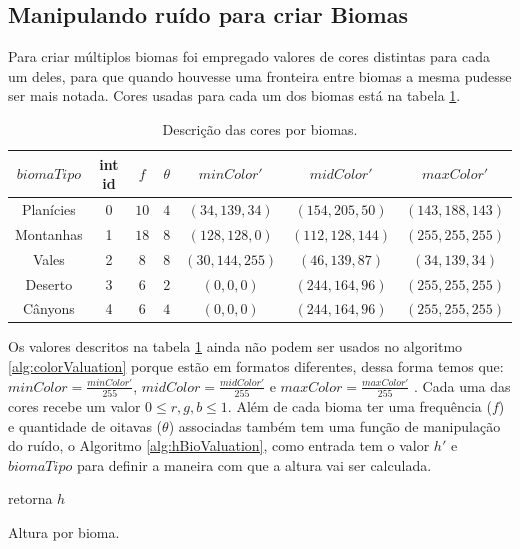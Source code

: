 \subsection{Manipulando ruído para criar Biomas}
Para criar múltiplos biomas foi empregado valores de cores distintas para cada um deles, 
para que quando houvesse uma fronteira entre biomas a mesma pudesse ser mais notada. 
Cores usadas para cada um dos biomas está na tabela \ref{tab:bioColors}.
\begin{table}[H]
    \centering
    \caption{Descrição das cores por biomas.}
    \label{tab:bioColors}
    \begin{tabular}{| c | c c c c c c|}
        \hline
        $biomaTipo$ & int id & $f$ & $\theta$ & $minColor'$ & $midColor'$ & $maxColor'$\\
        \hline
        Planícies   & 0 & $10$ & $4$ & $(34, 139, 34) $ & $(154, 205, 50) $ & $(143,188,143)  $  \\
        Montanhas & 1 & $18$ & $8$ & $(128, 128, 0) $ & $(112, 128, 144)$ & $(255, 255, 255)$  \\
        Vales   & 2 & $8$  & $8$ & $(30, 144, 255)$ & $(46, 139, 87)  $ & $(34, 139, 34)  $  \\
        Deserto   & 3 & $6$  & $2$ & $(0, 0, 0)     $ & $(244, 164, 96) $ & $(255, 255, 255)$  \\
        Cânyons  & 4 & $6$  & $4$ & $(0, 0, 0)     $ & $(244, 164, 96) $ & $(255, 255, 255)$  \\
        \hline
    \end{tabular}
\end{table}

Os valores descritos na tabela \ref{tab:bioColors} ainda não podem ser usados no
algoritmo \ref{alg:colorValuation} porque estão em formatos diferentes, dessa forma temos
que: $minColor = \frac{minColor'}{255}$, $midColor = \frac{midColor'}{255}$ e $maxColor = \frac{maxColor'}{255}$ . Cada uma das cores recebe um valor
$0 \leq r, g, b \leq 1$.
Além de cada bioma ter uma frequência ($f$) e quantidade de oitavas ($\theta$) associadas
também tem uma função de manipulação do ruído, o Algoritmo \ref{alg:hBioValuation}, 
como entrada tem o valor $h'$ e $biomaTipo$ para definir a maneira com que a altura vai ser
calculada.

\begin{algorithm}[H]\label{alg:hBioValuation}
    retorna $h$\;
    \caption{Altura por bioma.}
\end{algorithm}

